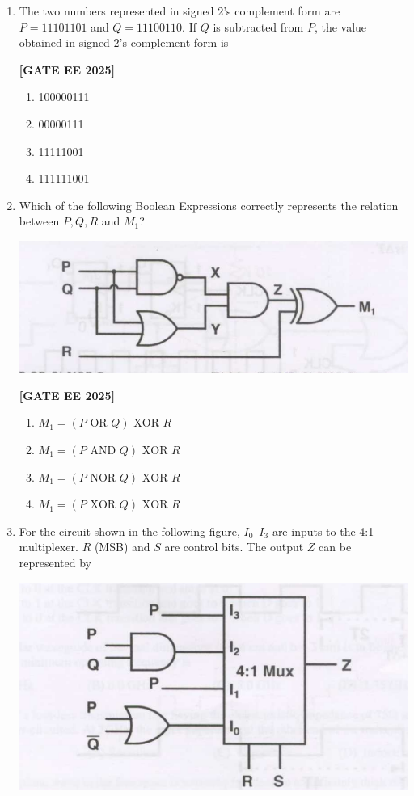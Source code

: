 \documentclass[12pt]{article}
\begin{document}
\begin{enumerate}[leftmargin=*, label=\textbf{Q.\arabic*:}]
\item The two numbers represented in signed $2$'s complement form are \\
$P=11101101$ and $Q=11100110$. If $Q$ is subtracted from $P$, the value obtained in signed $2$'s complement form is
 
\noindent \textbf{[GATE EE 2025]}
\begin{enumerate}
    \item 100000111
    \item 00000111
    \item 11111001
    \item 111111001
\end{enumerate}

\item Which of the following Boolean Expressions correctly represents the relation between $P, Q, R$ and $M_1$?
\begin{center}
\includegraphics[width=0.6\columnwidth]{figs/q57.png}
\end{center}
 
\noindent \textbf{[GATE EE 2025]}
\begin{enumerate}
  \item $M_1 = (P \text{ OR } Q) \text{ XOR } R$
  \item $M_1 = (P \text{ AND } Q) \text{ XOR } R$
  \item $M_1 = (P \text{ NOR } Q) \text{ XOR } R$
  \item $M_1 = (P \text{ XOR } Q) \text{ XOR } R$
\end{enumerate}

\item For the circuit shown in the following figure, $I_0$–$I_3$ are inputs to the 4:1 multiplexer. $R$ (MSB) and $S$ are control bits. The output $Z$ can be represented by
\begin{center}
\includegraphics[width=0.6\columnwidth]{figs/q58.png}
\end{center}
 

\end{enumerate}
\end{document}
